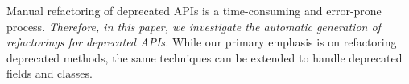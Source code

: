 \documentclass[sigconf]{acmart}
\begin{document}

Manual refactoring of deprecated APIs is a time-consuming and error-prone process. \emph{Therefore, in this paper, we investigate the automatic generation of refactorings for deprecated APIs.} While our primary emphasis is on refactoring deprecated methods, the same techniques can be extended to handle deprecated fields and classes.



\end{document}
